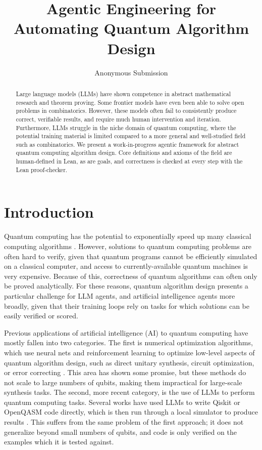 \documentclass[letterpaper]{article} %
\title{Agentic Engineering for Automating Quantum Algorithm Design}
\author{Anonymous Submission}
\begin{document}
\maketitle

\begin{abstract}
Large language models (LLMs) have shown competence in abstract mathematical research and theorem proving.
Some frontier models have even been able to solve open problems in combinatorics.
However, these models often fail to consistently produce correct, verifiable results, and require
much human intervention and iteration.
Furthermore, LLMs struggle in the niche domain of quantum computing, where the potential training material is
limited compared to a more general and well-studied field such as combinatorics.
We present a work-in-progress agentic framework for abstract quantum computing algorithm design.
Core definitions and axioms of the field are human-defined in Lean, as are goals,
and correctness is checked at every step with the Lean proof-checker.
\end{abstract}




\section{Introduction}

Quantum computing has the potential to exponentially speed up
many classical computing algorithms \cite{brandao2010exponential}.
However, solutions to quantum computing problems are often hard to verify,
given that quantum programs cannot be efficiently simulated on a classical computer,
and access to currently-available quantum machines is very expensive.
Because of this, correctness of quantum algorithms can often only be proved analytically.
For these reasons, quantum algorithm design
presents a particular challenge for LLM agents, and artificial intelligence agents more broadly,
given that their training loops rely on tasks for which solutions can be easily verified or scored.

Previous applications of artificial intelligence (AI) to quantum computing have mostly fallen
into two categories. The first is numerical optimization algorithms, which use neural
nets and reinforcement learning to optimize low-level aspects of quantum algorithm
design, such as direct unitary synthesis, circuit optimization, or error correcting
\cite{zhang2020topological,alam2023quantum,bao2024twisty}.
This area has shown some promise, but these methods do not scale to large numbers of qubits,
making them impractical for large-scale synthesis tasks.
The second, more recent category, is the use of LLMs to perform quantum computing tasks.
Several works have used LLMs to write Qiskit or OpenQASM code directly, which is then
run through a local simulator to produce results \cite{dupuis2024qiskit,yang2024qcircuitbench,
guo2025quanbench,vishwakarma2024qiskit,yu2025quasar,fu2025qagent}.
This suffers from the same problem of the first approach; it does not generalize beyond
small numbers of qubits, and code is only verified on the examples which it is tested
against.
\end{document}
